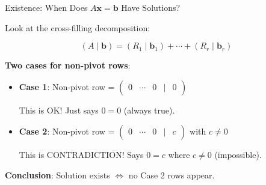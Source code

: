 \documentclass[10pt]{beamer}
\theoremstyle{definition}
\newcommand{\x}[1]{\alert{\textbf{#1}}}
\begin{document}
\begin{frame}{Existence: When Does $A\mathbf{x} = \mathbf{b}$ Have Solutions?}

Look at the cross-filling decomposition:

$$(A \mid \mathbf{b}) = (R_1 \mid \mathbf{b}_1) + \cdots + (R_r \mid \mathbf{b}_r)$$

\vspace{1em}

\x{Two cases for non-pivot rows}:

\begin{itemize}
\item \textbf{Case 1}: Non-pivot row = $\begin{pmatrix} 0 & \cdots & 0 & \mid & 0 \end{pmatrix}$

This is OK! Just says $0 = 0$ (always true).

\item \textbf{Case 2}: Non-pivot row = $\begin{pmatrix} 0 & \cdots & 0 & \mid & c \end{pmatrix}$ with $c \neq 0$

This is CONTRADICTION! Says $0 = c$ where $c \neq 0$ (impossible).
\end{itemize}

\vspace{1em}

\x{Conclusion}: Solution exists $\iff$ no Case 2 rows appear.

\end{frame}
\end{document}
